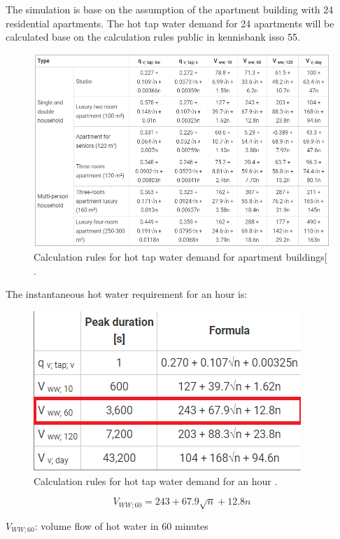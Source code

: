 The simulation is base on the assumption of the apartment building with 24 residential apartments.
The hot tap water demand for 24 apartments will be calculated base on the calculation rules public in kennisbank isso 55.

\begin{figure}[H]
\centering
\includegraphics[width=1\columnwidth]{pictures/Calculation rules for hot tap water demand for apartment buildings.png}
\caption[Short title]{Calculation rules for hot tap water demand for apartment buildings[ \cite{ISSO55}.}
\label{fig:calcrules_ap}
\end{figure}
The instantaneous hot water requirement for an hour is:

\begin{figure}[H]
\centering
\includegraphics[width=0.5\columnwidth]{pictures/tap water demand in an hour.png}
\caption[Short title]{Calculation rules for hot tap water demand for an hour \cite{ISSO55}.}
\label{fig:calchour}
\end{figure}

\begin{equation}
V_{WW;60} = 243 + 67.9\sqrt{n} + 12.8n
\end{equation}

$V_{WW;60}$: volume flow of hot water in 60 minutes

